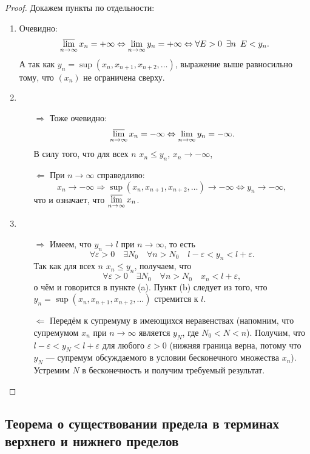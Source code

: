 \begin{proof}
	Докажем пункты по отдельности:
	\begin{enumerate}
		\item Очевидно: \[
		\varlimsup_{n \to \infty} x_n = +\infty \Leftrightarrow \lim_{n \to \infty} y_n = +\infty \Leftrightarrow \forall E > 0 \enskip \exists n \enskip E < y_n.
		\]
		А так как \(y_n = \sup(x_n, x_{n + 1}, x_{n + 2}, \ldots)\), выражение выше равносильно тому, что \((x_n)\) не ограничена сверху.
		\item 
		\begin{enumerate}
			\item[\(\Rightarrow\)] Тоже очевидно: \[
			\varlimsup\limits_{n \to \infty} x_n = -\infty \Leftrightarrow \lim_{n \to \infty} y_n = -\infty.
			\]
			В силу того, что для всех \(n\) \(x_n \leqslant y_n\), \(x_n \to -\infty\),
			\item[\(\Leftarrow\)] При \(n \to \infty\) справедливо: \[
			x_n \to -\infty \Rightarrow \sup(x_n, x_{n + 1}, x_{n + 2}, \ldots) \to -\infty \Leftrightarrow y_n \to -\infty,
			\]
			что и означает, что \(\varlimsup\limits_{n \to \infty} x_n\).
		\end{enumerate}
		\item
		\begin{enumerate}
			\item[\(\Rightarrow\)] Имеем, что \(y_n \to l\) при \(n \to \infty\), то есть \[
			\forall \varepsilon > 0 \quad  \exists N_0 \quad \forall n > N_0 \quad l - \varepsilon < y_n < l + \varepsilon.
			\]
			Так как для всех \(n\) \(x_n \leqslant y_n\), получаем, что \[
			\forall \varepsilon > 0 \quad  \exists N_0 \quad \forall n > N_0 \quad x_n < l + \varepsilon,
			\]
			о чём и говорится в пункте (a). Пункт (b) следует из того, что \(y_n = \sup(x_n, x_{n + 1}, x_{n + 2}, \ldots)\) стремится к \(l\).
			\item[\(\Leftarrow\)] Передём к супремуму в имеющихся неравенствах (напомним, что супремумом \(x_n\) при \(n \to \infty\) является \(y_N\), где \(N_0 < N < n\)). Получим, что \(l - \varepsilon < y_N < l + \varepsilon\) для любого \(\varepsilon > 0\) (нижняя граница верна, потому что \(y_N\) --- супремум обсуждаемого в условии бесконечного множества \(x_n\)). Устремим \(N\) в бесконечность и получим требуемый результат.
		\end{enumerate}
	\end{enumerate}
\end{proof}

\subsection{Теорема о существовании предела в терминах верхнего и нижнего пределов}

